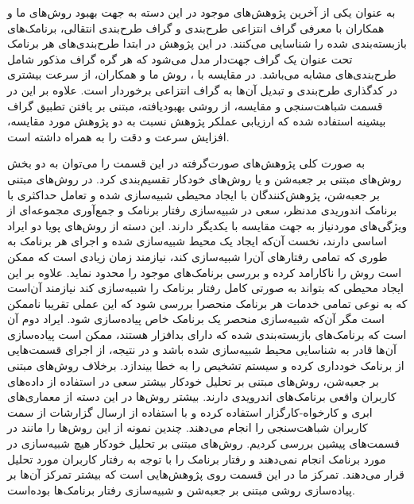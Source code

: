 به عنوان یکی از آخرین پژوهش‌های موجود در این دسته به جهت بهبود روش‌های  ما و همکاران  با معرفی گراف انتزاعی طرح‌بندی‌ و گراف طرح‌بندی انتقالی‌، برنامک‌های بازبسته‌بندی شده را شناسایی می‌کنند. در این پژوهش در ابتدا طرح‌بندی‌های هر برنامک تحت عنوان یک گراف جهت‌دار مدل می‌شود که هر گره‌ گراف مذکور شامل طرح‌بندی‌های مشابه می‌باشد. در مقایسه با ، روش ما و همکاران، از سرعت بیشتری در کدگذاری طرح‌بندی و تبدیل آن‌ها به گراف انتزاعی برخوردار است. علاوه بر این در قسمت شباهت‌سنجی و مقایسه، از روشی بهبود‌یافته، مبتنی بر یافتن تطبیق گراف بیشینه‌ استفاده شده که ارزیابی عملکر پژوهش نسبت به دو پژوهش مورد مقایسه، افزایش سرعت و دقت را به همراه داشته است.




به صورت کلی پژوهش‌های صورت‌گرفته  در این قسمت را می‌توان به دو بخش روش‌های مبتنی بر جعبه‌شن‌ و یا روش‌های خودکار تقسیم‌بندی کرد. در روش‌های مبتنی بر جعبه‌شن، پژوهش‌کنندگان با ایجاد محیطی شبیه‌سازی شده و تعامل حداکثری با برنامک اندوریدی مدنظر، سعی در شبیه‌سازی رفتار برنامک و جمع‌آوری مجموعه‌ای از ویژگی‌های موردنیاز به جهت مقایسه‌ با یکدیگر دارند. این دسته از روش‌های پویا دو ایراد اساسی دارند، نخست آن‌که ایجاد یک محیط شبیه‌سازی شده و اجرای هر برنامک به طوری که تمامی رفتار‌های آن‌‌را شبیه‌سازی کند، نیازمند زمان زیادی است که ممکن است روش را ناکارامد کرده و بررسی برنامک‌های موجود را محدود نماید. علاوه بر این ایجاد محیطی که بتواند به صورتی کامل رفتار برنامک را شبیه‌سازی کند نیازمند آن‌است که به نوعی تمامی خدمات هر برنامک منحصرا بررسی شود که این عملی تقریبا ناممکن است مگر آن‌که شبیه‌سازی منحصر یک برنامک خاص پیاده‌سازی شود. ایراد دوم آن‌ است که برنامک‌های بازبسته‌بندی شده که دارای بدافزار هستند، ممکن است پیاده‌سازی آن‌ها قادر به شناسایی محیط شبیه‌سازی شده باشد و در نتیجه، از اجرای قسمت‌هایی از برنامک خودداری کرده و سیستم تشخیص را به خطا بیندازد. برخلاف روش‌های مبتنی بر جعبه‌شن، روش‌های مبتنی بر تحلیل خودکار بیشتر سعی در استفاده از داده‌های کاربران واقعی برنامک‌های اندرویدی دارند. بیشتر روش‌ها در این دسته از معماری‌های ابری و کارخواه-کارگزار استفاده کرده و با استفاده از ارسال گزارشات‌ از سمت کاربران شباهت‌سنجی را انجام می‌دهند.
 چندین نمونه از این روش‌ها را مانند  در قسمت‌های پیشین بررسی کردیم. روش‌های مبتنی بر تحلیل خود‌کار هیچ شبیه‌سازی در مورد برنامک انجام نمی‌دهند و رفتار برنامک را با توجه به رفتار کاربران مورد تحلیل قرار می‌دهند. تمرکز ما در این قسمت روی پژوهش‌هایی است که بیشتر تمرکز آن‌ها بر پیاده‌سازی روشی مبتنی بر جعبه‌شن و شبیه‌سازی رفتار برنامک‌ها بوده‌است.
 
